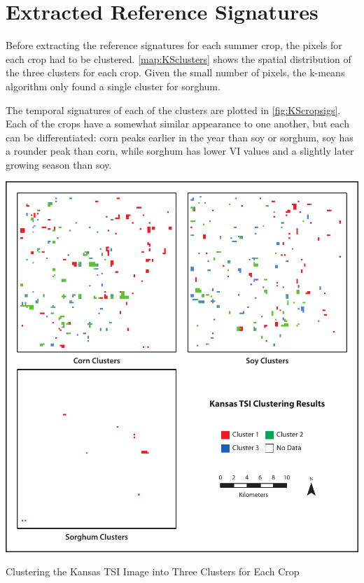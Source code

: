 \section{Extracted Reference Signatures}

Before extracting the reference signatures for each summer crop, the pixels for each crop had to be clustered. \autoref{map:KSclusters} shows the spatial distribution of the three clusters for each crop. Given the small number of pixels, the k-means algorithm only found a single cluster for sorghum.

The temporal signatures of each of the clusters are plotted in \autoref{fig:KScropsigs}. Each of the crops have a somewhat similar appearance to one another, but each can be differentiated: corn peaks earlier in the year than soy or sorghum, soy has a rounder peak than corn, while sorghum has lower VI values and a slightly later growing season than soy.

\begin{ssfigure}
  \centering
  \includegraphics[width=\textwidth]{Graphics/KSclustered.pdf}
  \caption{Clustering the Kansas TSI Image into Three Clusters for Each Crop}
  \label{map:KSclusters}
\end{ssfigure}


